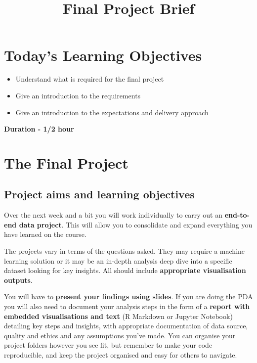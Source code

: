 \documentclass[
]{article}
\title{Final Project Brief}
\author{}
\date{\vspace{-2.5em}}
\providecommand{\tightlist}{%
  \setlength{\itemsep}{0pt}\setlength{\parskip}{0pt}}
\begin{document}
\maketitle

\hypertarget{todays-learning-objectives}{%
\section{\texorpdfstring{Today's Learning
Objectives}{Today's Learning Objectives }}\label{todays-learning-objectives}}

\begin{itemize}
\tightlist
\item
  Understand what is required for the final project
\item
  Give an introduction to the requirements
\item
  Give an introduction to the expectations and delivery approach
\end{itemize}

\textbf{Duration - 1/2 hour}

\hypertarget{the-final-project}{%
\section{The Final Project}\label{the-final-project}}

\hypertarget{project-aims-and-learning-objectives}{%
\subsection{Project aims and learning
objectives}\label{project-aims-and-learning-objectives}}

Over the next week and a bit you will work individually to carry out an
\textbf{end-to-end data project}. This will allow you to consolidate and
expand everything you have learned on the course.

The projects vary in terms of the questions asked. They may require a
machine learning solution or it may be an in-depth analysis deep dive
into a specific dataset looking for key insights. All should include
\textbf{appropriate visualisation outputs}.

You will have to \textbf{present your findings using slides}. If you are
doing the PDA you will also need to document your analysis steps in the
form of a \textbf{report with embedded visualisations and text} (R
Markdown or Jupyter Notebook) detailing key steps and insights, with
appropriate documentation of data source, quality and ethics and any
assumptions you've made. You can organise your project folders however
you see fit, but remember to make your code reproducible, and keep the
project organised and easy for others to navigate.
\end{document}
